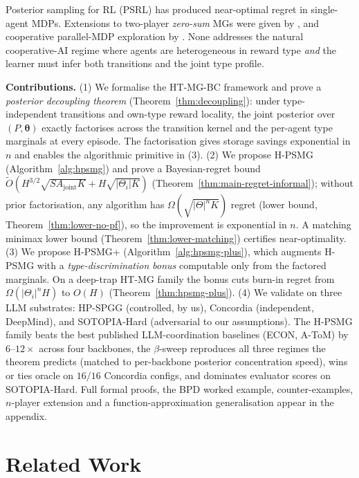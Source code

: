 ﻿\documentclass{article}
\def\textsuperscript#1{#1}%
\begin{document}
Posterior sampling for RL (PSRL) \citep{strens2000bayesian,osband2013more,agrawal2017optimistic,osband2017posterior} has produced near-optimal regret in single-agent MDPs. Extensions to two-player \emph{zero-sum} MGs were given by \citet{jafarnia2021learning,xiong2022self,yueh2026bayesian}, and cooperative parallel-MDP exploration by \citet{hsu2024randomized}. None addresses the natural cooperative-AI regime where agents are heterogeneous in reward type \emph{and} the learner must infer both transitions and the joint type profile.

\textbf{Contributions.} (1) We formalise the HT-MG-BC framework and prove a \emph{posterior decoupling theorem} (Theorem~\ref{thm:decoupling}): under type-independent transitions and own-type reward locality, the joint posterior over $(P, \boldsymbol{\theta})$ exactly factorises across the transition kernel and the per-agent type marginals at every episode. The factorisation gives storage savings exponential in $n$ and enables the algorithmic primitive in (3). (2) We propose H-PSMG (Algorithm~\ref{alg:hpsmg}) and prove a Bayesian-regret bound $\tilde O(H^{3/2}\sqrt{S A_{\mathrm{joint}} K} + H \sqrt{|\Theta_i| K})$ (Theorem~\ref{thm:main-regret-informal}); without prior factorisation, any algorithm has $\Omega(\sqrt{|\Theta|^n K})$ regret (lower bound, Theorem~\ref{thm:lower-no-pf}), so the improvement is exponential in $n$. A matching minimax lower bound (Theorem~\ref{thm:lower-matching}) certifies near-optimality. (3) We propose H-PSMG\textsuperscript{+} (Algorithm~\ref{alg:hpsmg-plus}), which augments H-PSMG with a \emph{type-discrimination bonus} computable only from the factored marginals. On a deep-trap HT-MG family the bonus cuts burn-in regret from $\Omega(|\Theta_i|^n H)$ to $O(H)$ (Theorem~\ref{thm:hpsmg-plus}). (4) We validate on three LLM substrates: HP-SPGG (controlled, by us), Concordia (independent, DeepMind), and SOTOPIA-Hard (adversarial to our assumptions). The H-PSMG family beats the best published LLM-coordination baselines (ECON, A-ToM) by $6$--$12\times$ across four backbones, the $\beta$-sweep reproduces all three regimes the theorem predicts (matched to per-backbone posterior concentration speed), wins or ties oracle on $16/16$ Concordia configs, and dominates evaluator scores on SOTOPIA-Hard. Full formal proofs, the BPD worked example, counter-examples, $n$-player extension and a function-approximation generalisation appear in the appendix.

\section{Related Work}
\label{sec:related}
\end{document}
